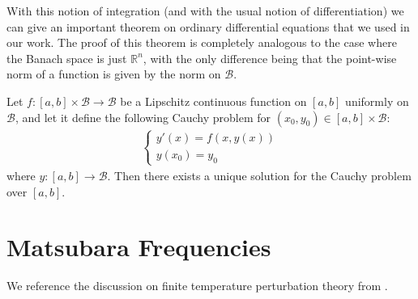 \begin{appendices}
With this notion of integration (and with the usual notion of differentiation) we can give an
important theorem on ordinary differential equations that we used in our work. The proof of
this theorem is completely analogous to the case where the Banach space is just $\mathbb{R}^n$,
with the only difference being that the point-wise norm of a function is given by the norm on
$\mathcal{B}$.

\begin{theorem}
	\label{thm:ODE}
	Let $f:[a,b]\times\mathcal{B}\to\mathcal{B}$ be a Lipschitz continuous function on $[a,b]$
	uniformly on $\mathcal{B}$, and let it define the following Cauchy problem for
	$(x_0,y_0)\in[a,b]\times\mathcal{B}$:
	\begin{align*}
		\begin{cases}
			y'(x) = f(x,y(x))\\
			y(x_0) = y_0
		\end{cases}
	\end{align*}
	where $y:[a,b]\to\mathcal{B}$. Then there exists a unique solution for the Cauchy problem
	over $[a,b]$.
\end{theorem}

\chapter{Matsubara Frequencies}
\label{matsubara}

We reference the discussion on finite temperature perturbation theory from
\cite[pp.~319--324]{GiuVigBook}.


\end{appendices}
